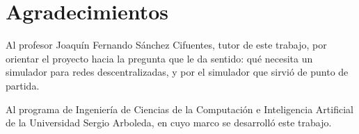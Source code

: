 
\section*{Agradecimientos}

Al profesor Joaquín Fernando Sánchez Cifuentes, tutor de este trabajo, por
orientar el proyecto hacia la pregunta que le da sentido: qué necesita un
simulador para redes descentralizadas, y por el simulador que
sirvió de punto de partida.

Al programa de Ingeniería de Ciencias de la Computación e Inteligencia Artificial
de la Universidad Sergio Arboleda, en cuyo marco se desarrolló este trabajo.

\newpage
